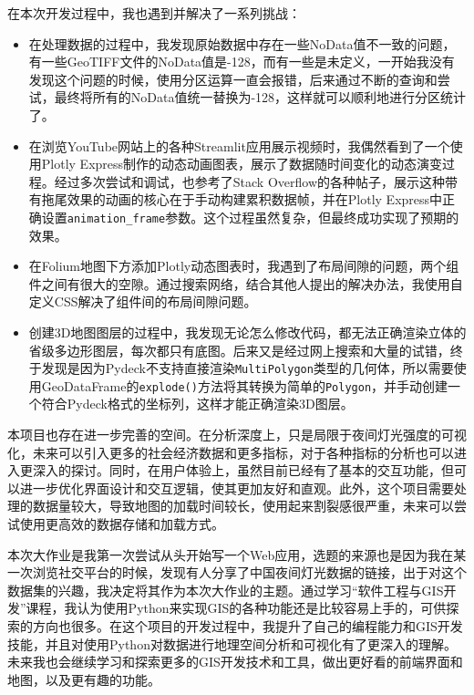 \documentclass[14pt,a4paper,UTF8,twoside]{article}
\begin{document}
在本次开发过程中，我也遇到并解决了一系列挑战：
\begin{itemize}
    \item 在处理数据的过程中，我发现原始数据中存在一些NoData值不一致的问题，有一些GeoTIFF文件的NoData值是-128，而有一些是未定义，一开始我没有发现这个问题的时候，使用分区运算一直会报错，后来通过不断的查询和尝试，最终将所有的NoData值统一替换为-128，这样就可以顺利地进行分区统计了。
    \item 在浏览YouTube网站上的各种Streamlit应用展示视频时，我偶然看到了一个使用Plotly Express制作的动态动画图表，展示了数据随时间变化的动态演变过程。经过多次尝试和调试，也参考了Stack Overflow的各种帖子，展示这种带有拖尾效果的动画的核心在于手动构建累积数据帧，并在Plotly Express中正确设置\texttt{animation\_frame}参数。这个过程虽然复杂，但最终成功实现了预期的效果。
     \item 在Folium地图下方添加Plotly动态图表时，我遇到了布局间隙的问题，两个组件之间有很大的空隙。通过搜索网络，结合其他人提出的解决办法，我使用自定义CSS解决了组件间的布局间隙问题。
     \item 创建3D地图图层的过程中，我发现无论怎么修改代码，都无法正确渲染立体的省级多边形图层，每次都只有底图。后来又是经过网上搜索和大量的试错，终于发现是因为Pydeck不支持直接渲染\texttt{MultiPolygon}类型的几何体，所以需要使用GeoDataFrame的\texttt{explode()}方法将其转换为简单的\texttt{Polygon}，并手动创建一个符合Pydeck格式的坐标列，这样才能正确渲染3D图层。
\end{itemize}

本项目也存在进一步完善的空间。在分析深度上，只是局限于夜间灯光强度的可视化，未来可以引入更多的社会经济数据和更多指标，对于各种指标的分析也可以进入更深入的探讨。同时，在用户体验上，虽然目前已经有了基本的交互功能，但可以进一步优化界面设计和交互逻辑，使其更加友好和直观。此外，这个项目需要处理的数据量较大，导致地图的加载时间较长，使用起来割裂感很严重，未来可以尝试使用更高效的数据存储和加载方式。

本次大作业是我第一次尝试从头开始写一个Web应用，选题的来源也是因为我在某一次浏览社交平台的时候，发现有人分享了中国夜间灯光数据的链接，出于对这个数据集的兴趣，我决定将其作为本次大作业的主题。通过学习“软件工程与GIS开发”课程，我认为使用Python来实现GIS的各种功能还是比较容易上手的，可供探索的方向也很多。在这个项目的开发过程中，我提升了自己的编程能力和GIS开发技能，并且对使用Python对数据进行地理空间分析和可视化有了更深入的理解。未来我也会继续学习和探索更多的GIS开发技术和工具，做出更好看的前端界面和地图，以及更有趣的功能。
\newpage

\appendix
\end{document}
